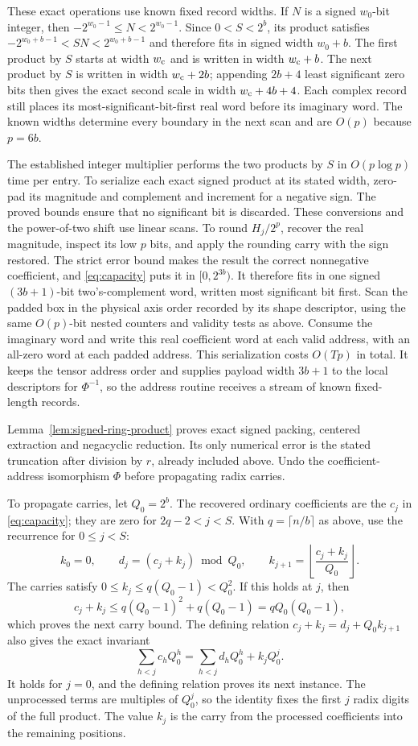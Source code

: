 \documentclass[11pt]{article}
\theoremstyle{definition}
\begin{document}
These exact operations use known fixed record widths. If $N$ is a
signed $w_0$-bit integer, then $-2^{w_0-1}\leq N<2^{w_0-1}$. Since
$0<S<2^b$, its product satisfies
$-2^{w_0+b-1}<SN<2^{w_0+b-1}$ and therefore fits in signed width $w_0+b$.
The first product by $S$ starts at width $w_{\rm c}$ and is written in
width $w_{\rm c}+b$. The next product by $S$ is written in width
$w_{\rm c}+2b$; appending $2b+4$ least significant zero bits then gives
the exact second scale in width $w_{\rm c}+4b+4$. Each complex record
still places its most-significant-bit-first real word before its imaginary
word. The known widths determine every boundary in the next scan and are
$O(p)$ because $p=6b$.

The established integer multiplier performs the two products by $S$ in
$O(p\log p)$ time per entry. To serialize each exact signed product at
its stated width, zero-pad its magnitude and complement and increment
for a negative sign. The proved bounds ensure that no significant bit is
discarded. These conversions and the power-of-two shift use linear scans.
To round $H_j/2^p$, recover the real magnitude, inspect its low $p$ bits,
and apply the rounding carry with the sign restored. The strict error
bound makes the result the correct nonnegative coefficient, and
\eqref{eq:capacity} puts it in $[0,2^{3b})$. It therefore fits in one
signed $(3b+1)$-bit two's-complement word, written most significant bit
first. Scan the padded box in the
physical axis order recorded by its shape descriptor, using the same
$O(p)$-bit nested counters and validity tests as above. Consume the
imaginary word and write this real coefficient word at each valid address,
with an all-zero
word at each padded address. This serialization costs $O(Tp)$ in total.
It keeps the tensor address order and supplies payload width $3b+1$ to
the local descriptors for $\Phi^{-1}$, so the address routine receives a
stream of known fixed-length records.

Lemma~\ref{lem:signed-ring-product} proves exact signed packing,
centered extraction and negacyclic reduction. Its only numerical error
is the stated truncation after division by $r$, already included above.
Undo the coefficient-address isomorphism $\Phi$ before propagating
radix carries.

To propagate carries, let $Q_0=2^b$.  The recovered ordinary
coefficients are the $c_j$ in \eqref{eq:capacity}; they are zero for
$2q-2<j<S$.  With $q=\lceil n/b\rceil$ as
above, use the recurrence for $0\le j<S$:
\[
 k_0=0,\qquad d_j=(c_j+k_j)\bmod Q_0,\qquad
 k_{j+1}=\left\lfloor\frac{c_j+k_j}{Q_0}\right\rfloor.
\]
The carries satisfy $0\le k_j\le q(Q_0-1)<Q_0^2$.  If this holds at
$j$, then
\[
 c_j+k_j\le q(Q_0-1)^2+q(Q_0-1)=qQ_0(Q_0-1),
\]
which proves the next carry bound.  The defining relation
$c_j+k_j=d_j+Q_0k_{j+1}$ also gives the exact invariant
\[
 \sum_{h<j}c_hQ_0^h
   =\sum_{h<j}d_hQ_0^h+k_jQ_0^j.
\]
It holds for $j=0$, and the defining relation proves its next instance.
The unprocessed terms are multiples of $Q_0^j$, so the identity fixes
the first $j$ radix digits of the full product.  The value $k_j$ is
the carry from the processed coefficients into the remaining positions.
\end{document}

